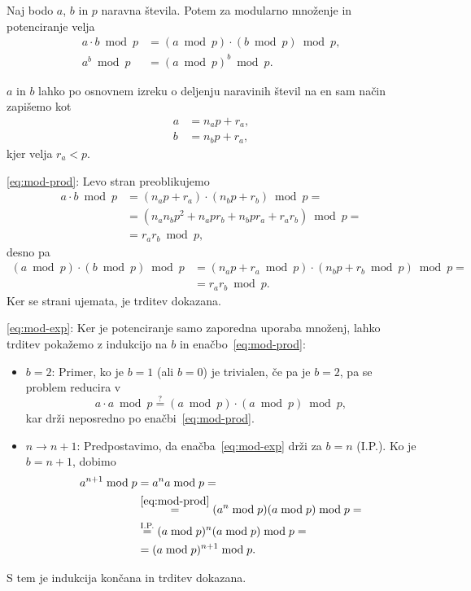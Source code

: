 \documentclass[isrm2, tisk]{fmfdelo}
\begin{document}
\begin{trditev}
\label{trd:mod-mn-pt}
    Naj bodo $a$, $b$ in $p$ naravna števila. Potem za modularno množenje in potenciranje velja
    \begin{align}
        a \cdot b \bmod p &= (a \bmod p) \cdot (b \bmod p) \bmod p, \label{eq:mod-prod} \\
        a^b \bmod p &= (a \bmod p)^b \bmod p. \label{eq:mod-exp} 
    \end{align}
\end{trditev}
\begin{dokaz}
    $a$ in $b$ lahko po osnovnem izreku o deljenju naravinih števil na en sam način zapišemo kot 
    \begin{align*}
        a &= n_a p + r_a, \\
        b &= n_b p + r_a,
    \end{align*}
    kjer velja $r_a < p$.
    
    \eqref{eq:mod-prod}: Levo stran preoblikujemo
    \begin{align*}
        a \cdot b \bmod p &= (n_a p + r_a) \cdot (n_b p + r_b) \bmod p = \\
                          &= (n_a n_b p^2 + n_a p r_b + n_b p r_a + r_a r_b) \bmod p = \\
                          &= r_a r_b \bmod p,
    \end{align*}
    desno pa
    \begin{align*}
        (a \bmod p) \cdot (b \bmod p) \bmod p &= (n_a p + r_a \bmod p) \cdot (n_b p + r_b \bmod p) \bmod p = \\
                          &= r_a r_b \bmod p.
    \end{align*}
    Ker se strani ujemata, je trditev dokazana.

    \eqref{eq:mod-exp}: Ker je potenciranje samo zaporedna uporaba množenj, lahko trditev pokažemo z 
    indukcijo na $b$ in enačbo~\eqref{eq:mod-prod}:
    \begin{itemize}
        \item $b = 2$: Primer, ko je $b = 1$ (ali $b = 0$) je trivialen, če pa je $b = 2$, pa se 
            problem reducira v 
            $$ 
            a \cdot a \bmod p \stackrel{?}{=} (a \bmod p) \cdot (a \bmod p) \bmod p,
            $$
            kar drži neposredno po enačbi~\eqref{eq:mod-prod}.
        \item $n \rightarrow n + 1$: Predpostavimo, da enačba~\eqref{eq:mod-exp} drži za $b = n$ (I.P.). 
            Ko je $b = n + 1$, dobimo 
            \begin{align*}
                a^{n + 1} \bmod p &= a^n a \bmod p = \\ 
                                  &\stackrel{\eqref{eq:mod-prod}}{=} (a^n \bmod p) (a \bmod p) \bmod p = \\
                                  &\stackrel{\text{I.P.}}{=} (a \bmod p)^n (a \bmod p) \bmod p = \\
                                  &= (a \bmod p)^{n + 1} \bmod p.
            \end{align*}
    \end{itemize}
    S tem je indukcija končana in trditev dokazana.
\end{dokaz}
\end{document}
